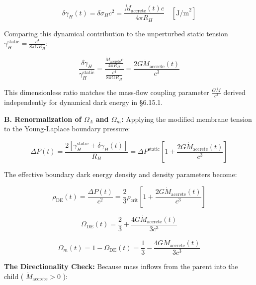 \documentclass[11pt,a4paper]{article}
\theoremstyle{definition}
\theoremstyle{remark}
\begin{document}
\begin{equation}
\delta\gamma_H(t) = \delta\sigma_H c^2 = \frac{\dot{M}_{\text{accrete}}(t) c}{4\pi R_H} \quad [\text{J/m}^2]
\end{equation}


Comparing this dynamical contribution to the unperturbed static tension $\gamma_H^{\text{static}} = \frac{c^4}{8\pi G R_H}$:


\begin{equation}
\boxed{\frac{\delta\gamma_H}{\gamma_H^{\text{static}}} = \frac{\frac{\dot{M}_{\text{accrete}} c}{4\pi R_H}}{\frac{c^4}{8\pi G R_H}} = \frac{2 G \dot{M}_{\text{accrete}}(t)}{c^3}}
\end{equation}


This dimensionless ratio matches the mass-flow coupling parameter $\frac{G \dot{M}}{c^3}$ derived independently for dynamical dark energy in \S 6.15.1.

\textbf{B. Renormalization of $\Omega_\Lambda$ and $\Omega_m$:}
Applying the modified membrane tension to the Young-Laplace boundary pressure:


\begin{equation}
\Delta P(t) = \frac{2 [\gamma_H^{\text{static}} + \delta\gamma_H(t)]}{R_H} = \Delta P^{\text{static}} \left[1 + \frac{2 G \dot{M}_{\text{accrete}}(t)}{c^3}\right]
\end{equation}


The effective boundary dark energy density and density parameters become:


\begin{equation}
\rho_{\text{DE}}(t) = \frac{\Delta P(t)}{c^2} = \frac{2}{3}\rho_{\text{crit}} \left[1 + \frac{2 G \dot{M}_{\text{accrete}}(t)}{c^3}\right]
\end{equation}



\begin{equation}
\boxed{\Omega_{\text{DE}}(t) = \frac{2}{3} + \frac{4 G \dot{M}_{\text{accrete}}(t)}{3 c^3}}
\end{equation}



\begin{equation}
\boxed{\Omega_m(t) = 1 - \Omega_{\text{DE}}(t) = \frac{1}{3} - \frac{4 G \dot{M}_{\text{accrete}}(t)}{3 c^3}}
\end{equation}


\textbf{The Directionality Check:}
Because mass inflows from the parent into the child ( $\dot{M}_{\text{accrete}} > 0$ ):
\end{document}
